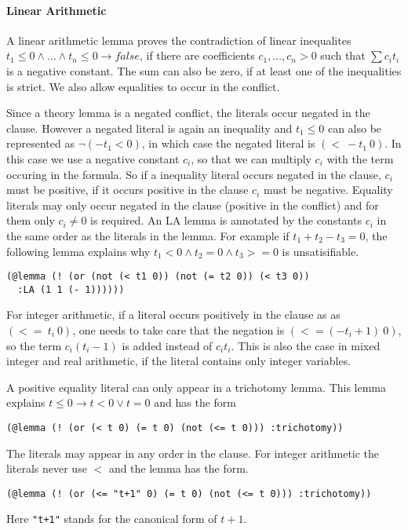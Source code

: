 \documentclass[a4paper]{article}
\begin{document}
\paragraph{Linear Arithmetic}

A linear arithmetic lemma proves the contradiction of linear
inequalites $t_1\leq 0\land \dots\land t_n\leq 0 \rightarrow false$, if
there are coefficients $c_1,\dots,c_n > 0$ such that $\sum c_it_i$ is
a negative constant.  The sum can also be zero, if at least one of the
inequalities is strict.  We also allow equalities to occur in the
conflict.

Since a theory lemma is a negated conflict, the literals occur negated
in the clause.  However a negated literal is again an inequality and
$t_1\leq 0$ can also be represented as $\neg (-t_1 <0)$, in which case
the negated literal is $(<\ -t_1\ 0)$.  In this case we use a negative
constant $c_i$, so that we can multiply $c_i$ with the term occuring
in the formula.  So if a inequality literal occurs negated in the
clause, $c_i$ must be positive, if it occurs positive in the clause
$c_i$ must be negative.  Equality literals may only occur negated in
the clause (positive in the conflict) and for them only $c_i\neq 0$ is
required.  An LA lemma is annotated by the constants $c_i$ in the same
order as the literals in the lemma.  For example if $t_1 + t_2 - t_3 =
0$, the following lemma explains why $t_1 < 0 \land t_2 = 0 \land t_3
>= 0$ is unsatisifiable.
\begin{verbatim}
(@lemma (! (or (not (< t1 0)) (not (= t2 0)) (< t3 0))
  :LA (1 1 (- 1))))))
\end{verbatim}

For integer arithmetic, if a literal occurs positively in the clause as
as $(<=\ t_i\ 0)$, one needs to take care that the negation is
$(<= (-t_i+1)\ 0)$, so the term $c_i(t_i - 1)$ is added instead
of $c_i t_i$.  This is also the case in mixed integer and real arithmetic,
if the literal contains only integer variables.

A positive equality literal can only appear in a trichotomy lemma.
This lemma explains $t \leq 0 \rightarrow t < 0 \lor t=0$ and has the form
\begin{verbatim}
(@lemma (! (or (< t 0) (= t 0) (not (<= t 0))) :trichotomy))
\end{verbatim}
The literals may appear in any order in the clause.  For integer
arithmetic the literals never use $<$ and the lemma has the form.
\begin{verbatim}
(@lemma (! (or (<= "t+1" 0) (= t 0) (not (<= t 0))) :trichotomy))
\end{verbatim}
Here \verb|"t+1"| stands for the canonical form of $t+1$.
\end{document}
